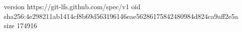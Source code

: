 version https://git-lfs.github.com/spec/v1
oid sha256:4e298211ab1414cf8b69d563196146eae56286175842480984d824ca9aff2e5a
size 174916
